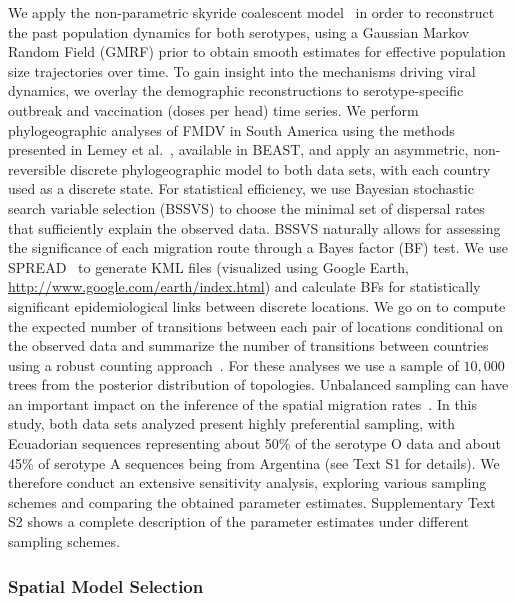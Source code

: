 \documentclass[10pt]{article}
\begin{document}
We apply the non-parametric skyride coalescent model~\cite{Minin2008a} in order to reconstruct the past population dynamics for both serotypes, using a Gaussian Markov Random Field (GMRF) prior to obtain smooth estimates for effective population size trajectories over time.
To gain insight into the mechanisms driving viral dynamics, we overlay the demographic reconstructions to serotype-specific outbreak and vaccination (doses per head) time series.
We perform phylogeographic analyses of FMDV in South America using the methods presented in Lemey et al.~\cite{Lemey2009}, available in BEAST, and apply an asymmetric, non-reversible discrete phylogeographic model to both data sets, with each country used as a discrete state.
For statistical efficiency, we use Bayesian stochastic search variable selection (BSSVS) to choose the minimal set of dispersal rates that sufficiently explain the observed data.
BSSVS naturally allows for assessing the significance of each migration route through a Bayes factor (BF) test.
We use SPREAD~\cite{Bielejec2011} to generate KML files (visualized using Google Earth, \url{http://www.google.com/earth/index.html}) and calculate BFs for statistically significant epidemiological links between discrete locations.
We go on to compute the expected number of transitions between each pair of locations conditional on the observed data and summarize the number of transitions between countries using a robust counting approach~\cite{Minin2008b}.
For these analyses we use a sample of $10,000$ trees from the posterior distribution of topologies.
Unbalanced sampling can have an important impact on the inference of the spatial migration rates~\cite{Faria2012, Lemey2014, Frost2015}.
In this study, both data sets analyzed present highly preferential sampling, with Ecuadorian sequences representing about 50\% of the serotype O data and about 45\% of serotype A sequences being from Argentina (see Text S1 for details).
We therefore conduct an extensive sensitivity analysis, exploring various sampling schemes and comparing the obtained parameter estimates.
Supplementary Text S2 shows a complete description of the parameter estimates under different sampling schemes. 

\subsubsection*{Spatial Model Selection}
\end{document}
